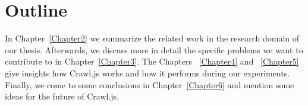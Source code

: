 \section{Outline}
In Chapter~\ref{Chapter2} we summarize the related work in the research domain of our thesis. Afterwards, we discuss more in detail the specific problems we want to contribute to in Chapter~\ref{Chapter3}. The Chapters ~\ref{Chapter4} and ~\ref{Chapter5} give insights how Crawl.js works and how it performs during our experiments. Finally, we come to some conclusions in Chapter~\ref{Chapter6} and mention some ideas for the future of Crawl.js.
